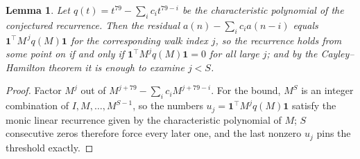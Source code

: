 \documentclass[11pt,a4paper]{article}
\theoremstyle{plain}
\newtheorem{lemma}[theorem]{Lemma}
\theoremstyle{definition}
\begin{document}
\begin{lemma}\label{lem:crit}
Let $q(t)=t^{79}-\sum_i c_it^{79-i}$ be the characteristic polynomial of the
conjectured recurrence. Then the residual $a(n)-\sum_ic_ia(n-i)$ equals
$\mathbf{1}^{\!\top}M^{\,j}q(M)\mathbf{1}$ for the corresponding walk index
$j$, so the recurrence holds from some point on if and only if
$\mathbf{1}^{\!\top}M^{j}q(M)\mathbf{1}=0$ for all large $j$; and by the
Cayley--Hamilton theorem it is enough to examine $j<S$.
\end{lemma}

\begin{proof}
Factor $M^{j}$ out of $M^{j+79}-\sum_ic_iM^{j+79-i}$. For the bound, $M^{S}$
is an integer combination of $I,M,\dots,M^{S-1}$, so the numbers
$u_j=\mathbf{1}^{\!\top}M^{j}q(M)\mathbf{1}$ satisfy the monic linear recurrence given by
the characteristic polynomial of $M$; $S$ consecutive zeros therefore force every later one,
and the last nonzero $u_j$ pins the threshold exactly.
\end{proof}
\end{document}
